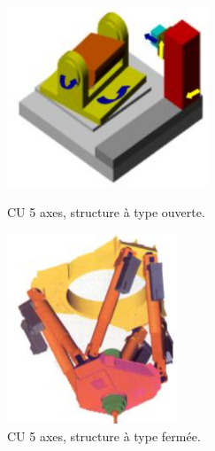 \documentclass[12pt]{article}
\begin{document}
\begin{figure}
\begin{minipage}{.55\linewidth}

\centering
\includegraphics[width=0.6\linewidth]{S1.PNG}
\caption{CU 5 axes, structure à type ouverte.}
\label{S1}

\end{minipage}
\begin{minipage}{.44\linewidth}

\centering
\includegraphics[width=0.6\linewidth]{S2.PNG}
\caption{CU 5 axes, structure à type fermée.}
\label{S2}

\end{minipage}
\end{figure}
\end{document}
